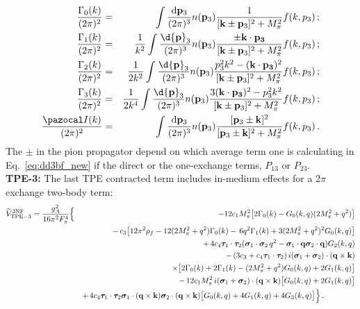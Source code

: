 \begin{eqnarray}
\label{eq:gamma0}
\frac{\Gamma_0(k)}{(2\pi)^2}&=& \qquad \int\frac{{\mathrm d}{\bf p}_3}{(2\pi)^3}n({\bf p}_3)
\frac{1}{[{\bf k}\pm{\bf p}_3]^2 + M_\pi^2}f(k,p_3)\,;
\\ \label{eq:gamma1}
\frac{\Gamma_1(k)}{(2\pi)^2}&=&\frac{1}{k^2}\int\frac{\d{\bf p}_3}{(2\pi)^3}n({\bf p}_3)
\frac{\pm{\bf k}\cdot{\bf p_3}}{[{\bf k}\pm{\bf p}_3]^2 + M_\pi^2}f(k,p_3)\,;
\\ \label{eq:gamma2}
\frac{\Gamma_2(k)}{(2\pi)^2}&=&\frac{1}{2k^2}\int\frac{\d{\bf p}_3}{(2\pi)^3}n({\bf p}_3)
\frac{p_3^2k^2-({\bf k}\cdot{\bf p_3})^2}{[{\bf k}\pm{\bf p}_3]^2 + M_\pi^2}f(k,p_3)\,;
\\ \label{eq:gamma3}
\frac{\Gamma_3(k)}{(2\pi)^2}&=&\frac{1}{2k^4}\int\frac{\d{\bf p}_3}{(2\pi)^3}n({\bf p}_3)
\frac{3({\bf k}\cdot{\bf p_3})^2-p_3^2k^2}{[{\bf k}\pm{\bf p}_3]^2 + M_\pi^2}f(k,p_3)\,;
\\ \label{eq:i_integral}
\frac{{\pazocal I}(k)}{(2\pi)^2}&=& \qquad  \int \frac{{\mathrm d}{\bf p}_3}{(2\pi)^3}n({\bf p}_3)
\frac{[{\bf p}_3\pm{\bf k}]^2}{[{\bf p}_3\pm{\bf k}]^2 + M_\pi^2}f(k,p_3)\,.
\end{eqnarray}
The $\pm$ in the pion propagator depend on which average term one is calculating in Eq.~\eqref{eq:dd3bf_new} if the direct or the one-exchange terms, $P_{13}$ or $P_{23}$.\\
\noindent
{\bf TPE-3:} The last TPE contracted term includes in-medium effects for a 2$\pi$ exchange two-body term:
\begin{eqnarray}
\nonumber 
\widetilde V_\mathrm{TPE-3}^\mathrm{3NF} = \frac{g_A^2}{16\pi^2F_\pi^4}
  &\Big\{ & -12c_1M_\pi^2\big[2\Gamma_0(k)-G_0(k,q)(2M_\pi^2+q^2)\big]
\\\nonumber &&   %
- \, c_3\big[12\pi^2\rho_f-12(2M_\pi^2+q^2)\Gamma_0(k)
- \, 6q^2\Gamma_1(k)+3(2M_\pi^2+q^2)^2G_0(k,q)\big] 
\\\nonumber &&  %
+  \, 4c_4 \boldsymbol\tau_1\cdot\boldsymbol\tau_2(\boldsymbol\sigma_1\cdot\boldsymbol\sigma_2\, q^2-\boldsymbol\sigma_1\cdot{\bf q}\boldsymbol\sigma_2\cdot{\bf q})
G_2(k,q)
\\\nonumber &&  %
-\, (3c_3+c_4\boldsymbol\tau_1\cdot\boldsymbol\tau_2)\,i(\boldsymbol\sigma_1+\boldsymbol\sigma_2)\cdot({\bf q}\times{\bf k})
\\\nonumber &&  \qquad \qquad \qquad \qquad \times
\big[2\Gamma_0(k)+2\Gamma_1(k)-(2M_\pi^2+q^2)G_0(k,q)+2G_1(k,q)\big]
\\\nonumber &&  %
- \, 12c_1M_\pi^2\,  i(\boldsymbol\sigma_1+\boldsymbol\sigma_2)\cdot({\bf q}\times{\bf k})
\big[G_0(k,q)+2G_1(k,q)\big]
\\ &&  %
+ \, 4c_4\boldsymbol\tau_1\cdot\boldsymbol\tau_2\boldsymbol\sigma_1\cdot({\bf q}\times{\bf k})\boldsymbol\sigma_2\cdot({\bf q}\times{\bf k})
\big[G_0(k,q)+4G_1(k,q)+4G_3(k,q)\big]\Big\} \,. \qquad \qquad 
\label{eq:tpe_dd_3}
\end{eqnarray}

